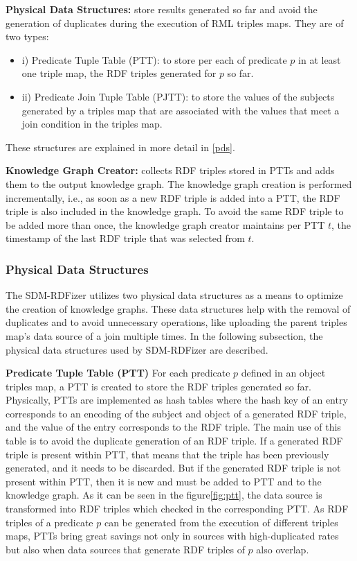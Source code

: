 \noindent\textbf{Physical Data Structures:} store results generated so far and avoid the generation of duplicates during the execution of RML triples maps. They are of two types: 
\begin{itemize}
\item i) Predicate Tuple Table (PTT): to store per each of predicate $p$ in at least one triple map, the RDF triples generated for $p$ so far. 
\item ii) Predicate Join Tuple Table (PJTT): to store the values of the subjects generated by a triples map that are associated with the values that meet a join condition in the triples map.  
\end{itemize}
These structures are explained in more detail in \autoref{pds}.

\noindent\textbf{Knowledge Graph Creator:} collects RDF triples stored in PTTs and adds them to the output knowledge graph. The knowledge graph creation is performed incrementally, i.e., as soon as a new RDF triple is added into a PTT, the RDF triple is also included in the knowledge graph. To avoid the same RDF triple to be added more than once, the knowledge graph creator maintains per PTT $t$, the timestamp of the last RDF triple that was selected from $t$. 

\subsubsection{Physical Data Structures}
The SDM-RDFizer utilizes two physical data structures as a means to optimize the creation of knowledge graphs. These data structures help with the removal of duplicates and to avoid unnecessary operations, like uploading the parent triples map's data source of a join multiple times. In the following subsection, the physical data structures used by SDM-RDFizer are described. 
\label{pds}

\noindent\textbf{Predicate Tuple Table (PTT)} 
For each predicate $p$ defined in an object triples map, a PTT is created to store the RDF triples generated so far. Physically, PTTs are implemented as hash tables where the hash key of an entry corresponds to an encoding of the subject and object of a generated RDF triple, and the value of the entry corresponds to the RDF triple. The main use of this table is to avoid the duplicate generation of an RDF triple. 
If a generated RDF triple is present within PTT, that means that the triple has been previously generated, and it needs to be discarded. But if the generated RDF triple is not present within PTT, then it is new and must be added to PTT and to the knowledge graph. As it can be seen in the figure\autoref{fig:ptt}, the data source is transformed into RDF triples which checked in the corresponding PTT. As RDF triples of a predicate $p$ can be generated from the execution of different triples maps, PTTs bring great savings not only in sources with high-duplicated rates but also when data sources that generate RDF triples of $p$ also overlap.  

